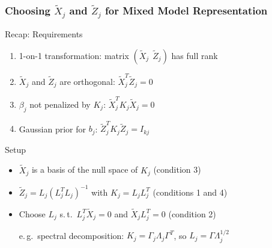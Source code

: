 \documentclass[final]{beamer}
\begin{document}
\begin{frame}
\frametitle{Choosing $\tilde{X}_j$ and $\tilde{Z}_j$ for Mixed Model Representation}

\begin{block}{\small Recap: Requirements}
\small
\begin{enumerate}
\itemsep0em 
\item 1-on-1 transformation: matrix $(\tilde{X}_j \:\:  \tilde{Z}_j)$ has full rank
\item $\tilde{X}_j$ and $\tilde{Z}_j$ are orthogonal: $\tilde{X}_j^T \tilde{Z}_j = 0$
\item $\beta_j$ not penalized by $K_j$: $\tilde{X}_j^T K_j \tilde{X}_j = 0$
\item Gaussian prior for $b_j$: $\tilde{Z}_j^T K_j \tilde{Z}_j = I_{kj}$
\end{enumerate}
\end{block}
\vspace{-1em}
\begin{block}{Setup}
\begin{itemize}
\item $\tilde{X}_j$ is a basis of the null space of $K_j$ (condition 3)
\item $\tilde{Z}_j =L_j (L_j^T L_j)^{-1}$ with $K_j =L_j L_j^T$ (conditions 1 and 4)
\item Choose $L_j$ s.\,t.\ $L_j^T\tilde{X}_j = 0$ and $\tilde{X}_jL_j^T = 0$ (condition 2)

e.\,g.\ spectral decomposition: 
$K_j = \Gamma_j \Lambda_j \Gamma^T$, so $L_j = \Gamma \Lambda_j^{1/2}$
\end{itemize}
\end{block}

\end{frame}
\end{document}
